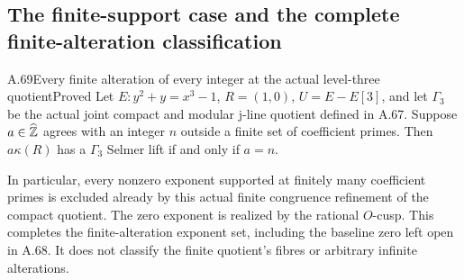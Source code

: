 \subsection{The finite-support case and the complete finite-alteration classification}

\begin{statement}{A.69}{Every finite alteration of every integer at the actual level-three quotient}{Proved}
Let $E:y^2+y=x^3-1$, $R=(1,0)$, $U=E-E[3]$, and let
$\Gamma_3$ be the actual joint compact and modular j-line
quotient defined in A.67. Suppose $a\in\widehat{\mathbb Z}$ agrees
with an integer $n$ outside a finite set of coefficient primes.
Then $a\kappa(R)$ has a $\Gamma_3$ Selmer lift if and only if
$a=n$.

In particular, every nonzero exponent supported at finitely
many coefficient primes is excluded already by this actual
finite congruence refinement of the compact quotient. The zero
exponent is realized by the rational $O$-cusp. This completes
the finite-alteration exponent set, including the baseline
zero left open in A.68. It does not classify the finite
quotient's fibres or arbitrary infinite alterations.
\end{statement}
